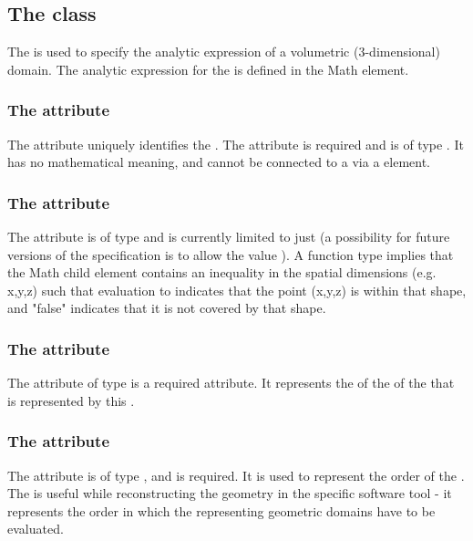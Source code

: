 \subsection{The  class}
\label{analyticvolume-class}
The \AnalyticVolume is used to specify the analytic expression of a volumetric (3-dimensional) domain. The analytic expression for the \AnalyticVolume is defined in the Math element.

\subsubsection{The \fixttspace{} attribute}
The  attribute uniquely identifies the \AnalyticVolume. The attribute is required and is of type .  It has no mathematical meaning, and cannot be connected to a \Parameter via a \SpatialSymbolReference element.

\subsubsection{The \fixttspace{} attribute}
The  attribute is of type  and is currently limited to just  (a possibility for future versions of the specification is to allow the value ).  A  function type implies that the Math child element contains an inequality in the spatial dimensions (e.g. x,y,z) such that evaluation to  indicates that the point (x,y,z) is within that shape, and "false" indicates that it is not covered by that shape.


\subsubsection{The \fixttspace{} attribute}
The  attribute of type  is a required attribute. It represents the  of the \DomainType of the \Domain that is represented by this \AnalyticVolume. 

\subsubsection{The \fixttspace{} attribute}
The  attribute is of type , and is required. It is used to represent the order of the \AnalyticVolume. The  is useful while reconstructing the geometry in the specific software tool - it represents the order in which the \AnalyticVolumes representing geometric domains have to be evaluated.

